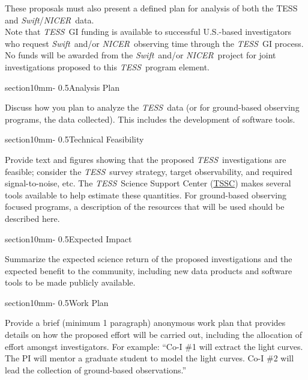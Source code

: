 \documentclass[letterpaper,12pt]{article}
\makeatletter
\renewcommand{\section}{\@startsection%
{section}{1}{0mm}{-\baselineskip}%
{0.5\baselineskip}{\normalfont\Large\bfseries}}%
\newcommand{\tess}{{\it TESS}}
\newcommand{\swift}{{\it Swift}}
\newcommand{\nicer}{{\it NICER}}
\makeatother
\begin{document}
These proposals must also present a defined plan for analysis of both the TESS and \swift/\nicer ~data.\\

\noindent Note that \tess\ GI funding is available to successful U.S.-based investigators who request \swift\ and/or \nicer ~observing time through the \tess\ GI process. No funds will be awarded from the \swift\ and/or \nicer\ project for joint investigations proposed to this \tess\ program element. 

\section{Analysis Plan}

Discuss how you plan to analyze the \tess\ data (or for ground-based observing programs, the data collected). This includes the development of software tools.

\section{Technical Feasibility}

Provide text and figures showing that the proposed \tess\ investigations are feasible; consider the \tess\ survey strategy, target observability, and required signal-to-noise, etc. The \tess\ Science Support Center (\href{https://heasarc.gsfc.nasa.gov/docs/tess/}{TSSC}) makes several tools available to help estimate these quantities. For ground-based observing focused programs, a description of the resources that will be used should be described here.

\section{Expected Impact}

Summarize the expected science return of the proposed investigations and the expected benefit to the community, including new data products and software tools to be made publicly available.

\section{Work Plan}

Provide a brief (minimum 1 paragraph) anonymous work plan that provides details on how the proposed effort will be carried out, including the allocation of effort amongst investigators. For example: ``Co-I \#1 will extract the light curves. The PI will mentor a graduate student to model the light curves. Co-I \#2 will lead the collection of ground-based observations.'' 
\\
\end{document}
